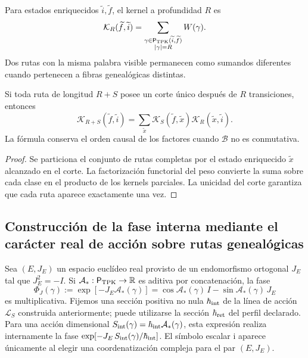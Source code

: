 Para estados enriquecidos \(\widetilde i,\widetilde f\), el kernel a
profundidad \(R\) es
\begin{equation}
 \mathcal K_R(\widetilde f,\widetilde i)
 =\sum_{\substack{
   \gamma\in\mathsf P_{\rm TPK}(\widetilde i,\widetilde f)\\
   |\gamma|=R}}
 W(\gamma).
 \label{eq:kernel-genealogico-finito-rev2}
\end{equation}
Dos rutas con la misma palabra visible permanecen como sumandos diferentes
cuando pertenecen a fibras genealógicas distintas.

\begin{proposition}
\label{prop:composicion-kernel-enriquecido-rev2}
Si toda ruta de longitud \(R+S\) posee un corte único después de \(R\)
transiciones, entonces
\[
 \mathcal K_{R+S}(\widetilde f,\widetilde i)
 =\sum_{\widetilde x}
 \mathcal K_S(\widetilde f,\widetilde x)
 \mathcal K_R(\widetilde x,\widetilde i).
\]
La fórmula conserva el orden causal de los factores cuando \(\mathcal B\) no
es conmutativa.
\end{proposition}

\begin{proof}
Se particiona el conjunto de rutas completas por el estado enriquecido
\(\widetilde x\) alcanzado en el corte. La factorización functorial del peso
convierte la suma sobre cada clase en el producto de los kernels parciales.
La unicidad del corte garantiza que cada ruta aparece exactamente una vez.
\end{proof}

\subsection{Construcción de la fase interna mediante el carácter real de acción sobre rutas genealógicas}

Sea \((E,J_E)\) un espacio euclídeo real provisto de un endomorfismo
ortogonal \(J_E\) tal que \(J_E^2=-I\). Si
\(\mathcal A_*:\mathsf P_{\rm TPK}\to\mathbb R\) es aditiva por
concatenación, la fase
\begin{equation}
 \Phi_J(\gamma)
 :=\exp[-J_E\mathcal A_*(\gamma)]
 =\cos\mathcal A_*(\gamma)\,I
  -\sin\mathcal A_*(\gamma)\,J_E
 \label{eq:fase-interna-caminos-rev2}
\end{equation}
es multiplicativa. Fijemos una sección positiva no nula
\(\hbar_{\rm int}\) de la línea de acción \(\mathcal L_S\)
construida anteriormente; puede utilizarse la sección
\(\hbar_{\rm ret}\) del perfil declarado.
Para una acción dimensional
\(S_{\rm int}(\gamma)=\hbar_{\rm int}\mathcal A_*(\gamma)\), esta
expresión realiza internamente la fase
\(\exp[-J_E\,S_{\rm int}(\gamma)/\hbar_{\rm int}]\). El símbolo escalar
\(\mathrm i\) aparece únicamente al elegir una coordenatización compleja para el par
\((E,J_E)\).

